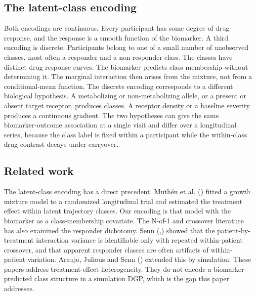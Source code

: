\documentclass[
  11pt,
]{article}
\begin{document}
\subsection{The latent-class encoding}\label{the-latent-class-encoding}

Both encodings are continuous. Every participant has some degree of
drug response, and the response is a smooth function of the
biomarker. A third encoding is discrete. Participants belong to one of
a small number of unobserved classes, most often a responder and a
non-responder class. The classes have distinct drug-response curves.
The biomarker predicts class membership without determining it. The
marginal interaction then arises from the mixture, not from a
conditional-mean function. The discrete encoding corresponds to a
different biological hypothesis. A metabolizing or non-metabolizing
allele, or a present or absent target receptor, produces classes. A
receptor density or a baseline severity produces a continuous
gradient. The two hypotheses can give the same biomarker-outcome
association at a single visit and differ over a longitudinal series,
because the class label is fixed within a participant while the
within-class drug contrast decays under carryover.

\subsection{Related work}\label{related-work}

The latent-class encoding has a direct precedent. Muthén et al.
() fitted a growth mixture model to a randomized
longitudinal trial and estimated the treatment effect within latent
trajectory classes. Our encoding is that model with the biomarker as a
class-membership covariate. The N-of-1 and crossover literature has
also examined the responder dichotomy. Senn (,) showed that the patient-by-treatment interaction
variance is identifiable only with repeated within-patient crossover,
and that apparent responder classes are often artifacts of
within-patient variation. Araujo, Julious and Senn ()
extended this by simulation. These papers address treatment-effect
heterogeneity. They do not encode a biomarker-predicted class
structure in a simulation DGP, which is the gap this paper addresses.
\end{document}
